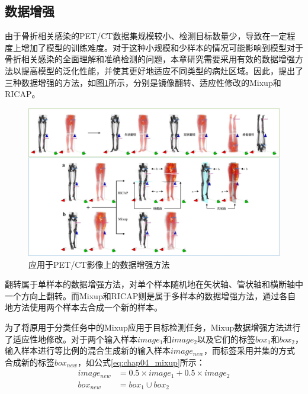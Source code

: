 \subsection{数据增强}

由于骨折相关感染的PET/CT数据集规模较小、检测目标数量少，导致在一定程度上增加了模型的训练难度。对于这种小规模和少样本的情况可能影响到模型对于骨折相关感染的全面理解和准确检测的问题，本章研究需要采用有效的数据增强方法以提高模型的泛化性能，并使其更好地适应不同类型的病灶区域。因此，提出了三种数据增强的方法，如图\ref{fig:chap04_augmentation}所示，分别是镜像翻转、适应性修改的Mixup和RICAP。

\begin{figure}[htbp]
  \centering
  \includegraphics[width=\textwidth]{figures/chap04_augmentation.jpg}
  \caption{应用于PET/CT影像上的数据增强方法}
  \label{fig:chap04_augmentation}
\end{figure}

翻转属于单样本的数据增强方法，对单个样本随机地在矢状轴、管状轴和横断轴中一个方向上翻转。而Mixup和RICAP则是属于多样本的数据增强方法，通过各自地方法使用两个样本去合成一个新的样本。

为了将原用于分类任务中的Mixup应用于目标检测任务，Mixup数据增强方法进行了适应性地修改。对于两个输入样本\(image_1\)和\(image_2\)以及它们的标签\(box_1\)和\(box_2\)，输入样本进行等比例的混合生成新的输入样本\(image_{new}\)，而标签采用并集的方式合成新的标签\(box_{new}\)，如公式\ref{eq:chap04_mixup}所示：
\begin{equation}
  \begin{aligned}
    image_{new} & = 0.5 \times image_1 + 0.5 \times image_2 \\
    box_{new}   & = box_1 \cup box_2
  \end{aligned}
  \label{eq:chap04_mixup}
\end{equation}

